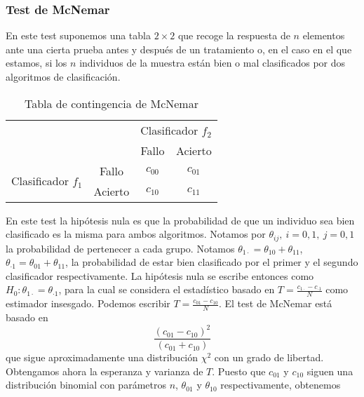 \subsubsection{Test de McNemar}
	
	En este test suponemos una tabla $2 \times 2$ que recoge la respuesta de $n$ elementos ante una cierta prueba antes y después de un tratamiento o, en el caso en el que estamos, si los $n$ individuos de la muestra están bien o mal clasificados por dos algoritmos de clasificación.
	
\begin{table}[]
\centering
\caption{Tabla de contingencia de McNemar}
\label{Tb:McNemar}
\begin{tabular}{|lc|cc|}
\hline
                                                          &         & \multicolumn{2}{c|}{Clasificador $f_2$} \\ \cline{3-4} 
                                                          &         & Fallo              & Acierto            \\ \hline
\multicolumn{1}{|c|}{\multirow{2}{*}{Clasificador $f_1$}} & Fallo   & $c_{00}$           & $c_{01}$           \\
\multicolumn{1}{|c|}{}                                    & Acierto & $c_{10}$           & $c_{11}$           \\ \hline
\end{tabular}
\end{table}

	En este test la hipótesis nula es que la probabilidad de que un individuo sea bien clasificado es la misma para ambos algoritmos. Notamos por $\theta_{ij},\ i=0,1,\ j=0,1$ la probabilidad de pertenecer a cada grupo. Notamos $\theta_{1 \cdot} = \theta_{10} + \theta_{11}$, $\theta_{\cdot 1} = \theta_{01} + \theta_{11}$, la probabilidad de estar bien clasificado por el primer y el segundo clasificador respectivamente. La hipótesis nula se escribe entonces como $H_0: \theta_{1 \cdot} = \theta_{\cdot 1}$, para la cual se considera el estadístico basado en $T = \frac{c_{1 \cdot} - c_{\cdot 1}}{N}$ como estimador insesgado. Podemos escribir $T = \frac{c_{01} - c_{10}}{N}$. El test de McNemar está basado en
	\[ \frac{(c_{01} - c_{10})^2}{(c_{01} + c_{10})} \]
	que sigue aproximadamente una distribución $\chi^2$ con un grado de libertad. Obtengamos ahora la esperanza y varianza de $T$. Puesto que $c_{01}$ y $c_{10}$ siguen una distribución binomial con parámetros $n$, $\theta_{01}$ y $\theta_{10}$ respectivamente, obtenemos

